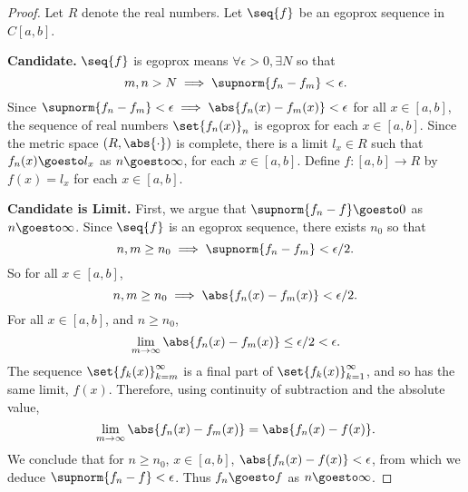 \begin{proof}Let $R$ denote the real numbers.
Let $\seq{f}$ be an egoprox sequence
in $C[a, b]$.

\textbf{Candidate.} $\seq{f}$ is egoprox means $\forall \epsilon > 0, \exists N$ so that
\[
m, n > N \implies \supnorm{f_n - f_m} < \epsilon .
\]
Since $\supnorm{f_n - f_m} < \epsilon  \implies \abs{f_n(x) - f_m(x)} < \epsilon $ for all $x \in [a, b]$, the sequence of real numbers $\set{f_n(x)}_n$ is egoprox for each $x \in [a, b]$.
Since the metric space $(R, \abs{\cdot })$ is complete, there is a limit $l_x \in R$ such that $f_n(x) \goesto l_x$ as $n \goesto \infty$, for each $x \in [a, b]$.
Define $f: [a, b] \to R$ by $f(x) = l_x$ for each $x \in [a, b]$.

\textbf{Candidate is Limit.}
First, we argue that
$\supnorm{f_n - f} \goesto 0$
as $n \goesto \infty$.
Since $\seq{f}$ is an egoprox sequence, there exists $n_0$ so that
\[
n,m \geq n_0
\implies
\supnorm{f_n - f_m} < \epsilon /2.
\]
So for all $x \in [a, b]$,
\[
n,m \geq n_0
\implies
\abs{f_n(x) - f_m(x)} < \epsilon /2.
\]
For all $x \in [a, b]$, and $n \geq n_0$,
\[
\lim_{m \to \infty} \abs{f_n(x) - f_m(x)}
\leq \epsilon /2 < \epsilon .
\]
The sequence
$\set{f_k(x)}_{k = m}^{\infty}$
is a final part of
$\set{f_k(x)}_{k = 1}^{\infty}$,
and so has the same limit, $f(x)$.
Therefore, using continuity
of subtraction and the absolute
value,
\[
\lim_{m \to \infty}
\abs{f_n(x) - f_m(x)}
=
\abs{f_n(x) - f(x)}.
\]
We conclude that for
$n \geq n_0$,
$x \in [a, b]$,
$\abs{f_n(x) - f(x)} < \epsilon $,
from which we deduce
$\supnorm{f_n - f} < \epsilon $.
Thus $f_n \goesto f$
as $n \goesto \infty$.


\end{proof}
